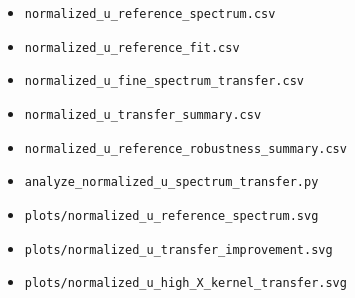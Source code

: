 \documentclass[12pt]{article}
\begin{document}
\begin{itemize}
\item \texttt{normalized\_u\_reference\_spectrum.csv}
\item \texttt{normalized\_u\_reference\_fit.csv}
\item \texttt{normalized\_u\_fine\_spectrum\_transfer.csv}
\item \texttt{normalized\_u\_transfer\_summary.csv}
\item \texttt{normalized\_u\_reference\_robustness\_summary.csv}
\item \texttt{analyze\_normalized\_u\_spectrum\_transfer.py}
\item \texttt{plots/normalized\_u\_reference\_spectrum.svg}
\item \texttt{plots/normalized\_u\_transfer\_improvement.svg}
\item \texttt{plots/normalized\_u\_high\_X\_kernel\_transfer.svg}
\end{itemize}
\end{document}
